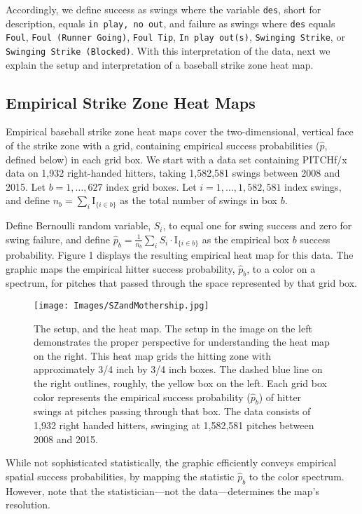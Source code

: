 Accordingly, we define success as swings where the variable \verb|des|, short for description, equals \verb|in play, no out|, and failure as swings where \verb|des| equals \verb|Foul|, \verb|Foul (Runner Going)|, \verb|Foul Tip|, \verb|In play out(s)|, \verb|Swinging Strike|, or \\ \verb|Swinging Strike (Blocked)|. With this interpretation of the data, next we explain the setup and interpretation of a baseball strike zone heat map.

\subsection{Empirical Strike Zone Heat Maps}

Empirical baseball strike zone heat maps cover the two-dimensional, vertical face of the strike zone with a grid, containing empirical success probabilities ($\hat{p}$, defined below) in each grid box.  We start with a data set containing PITCHf/x\textsuperscript{\textregistered} data on 1,932 right-handed hitters, taking 1,582,581 swings between 2008 and 2015.  Let $b = 1, \dots, 627$ index grid boxes. Let $i = 1, \dots, 1,582,581$ index swings, and define $n_{b} = \displaystyle\sum_{i} \text{I}_{\{i \in b \}}$ as the total number of swings in box $b$.

Define Bernoulli random variable, $S_{i}$, to equal one for swing success and zero for swing failure, and define $\hat{p}_{b} = \frac{1}{n_{b}} \displaystyle\sum_{i} S_{i} \cdot \text{I}_{\{i \in b \}}$ as the empirical box $b$ success probability. Figure 1 displays the resulting empirical heat map for this data. The graphic maps the empirical hitter success probability, $\hat{p}_{b}$, to a color on a spectrum, for pitches that passed through the space represented by that grid box.
  \begin{figure}[H]
	\centering
	\texttt{[image: Images/SZandMothership.jpg]} 
  \caption{The setup, and the heat map. The setup in the image on the left demonstrates the proper perspective for understanding the heat map on the right. This heat map grids the hitting zone with approximately 3/4 inch by 3/4 inch boxes. The dashed blue line on the right outlines, roughly, the yellow box on the left. Each grid box color represents the empirical success probability ($\hat{p}_{b}$) of hitter swings at pitches passing through that box.  The data consists of 1,932 right handed hitters, swinging at 1,582,581 pitches between 2008 and 2015.}
	\end{figure} 
While not sophisticated statistically, the graphic efficiently conveys empirical spatial success probabilities, by mapping the statistic $\hat{p}_{b}$ to the color spectrum. However, note that the statistician---not the data---determines the map's resolution.

